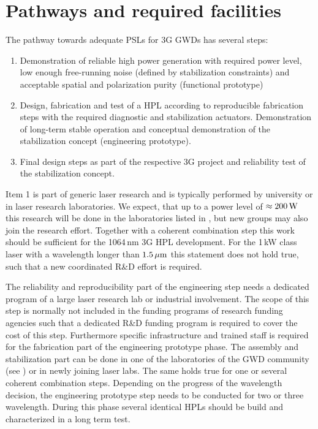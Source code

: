 \section{Pathways and required facilities} \label{sec:pathway}
The pathway towards adequate PSLs for 3G GWDs has several steps:
\begin{enumerate}
	\item Demonstration of reliable high power generation with required power level, low enough free-running noise (defined by stabilization constraints) and acceptable spatial and polarization purity (functional prototype)
	\item Design, fabrication and test of a HPL according to reproducible fabrication steps with the required diagnostic and stabilization actuators. Demonstration of long-term stable operation and conceptual demonstration of the stabilization concept (engineering prototype).
	\item Final design steps as part of the respective 3G project and reliability test of the stabilization concept.
\end{enumerate}

\noindent Item 1 is part of generic laser research and is typically performed by university or in laser research laboratories. We expect, that up to a power level of $ \approx 200 \, {\rm W} $ this research will be done in the laboratories listed in \cite{LightSource_RD_table}, but new groups may also join the research effort. Together with a coherent combination step this work should be sufficient for the 1064\,nm 3G HPL development.
For the 1\,kW class laser with a wavelength longer than $ 1.5\, {\rm \mu m}$ this statement does not hold true, such that a new coordinated R\&D effort is required.

The reliability and reproducibility part of the engineering step needs a dedicated program of a large laser research lab or industrial involvement. The scope of this step is normally not included in the funding programs of research funding agencies such that a dedicated R\&D funding program is required to cover the cost of this step.
Furthermore specific infrastructure and trained staff is required for the fabrication part of the engineering prototype phase. The assembly and stabilization part can be done in one of the laboratories of the GWD community (see \cite{LightSource_RD_table}) or in newly joining laser labs. The same holds true for one or several coherent combination steps. Depending on the progress of the wavelength decision, the engineering prototype step needs to be conducted for two or three wavelength. During this phase several identical HPLs should be build and characterized in a long term test.

